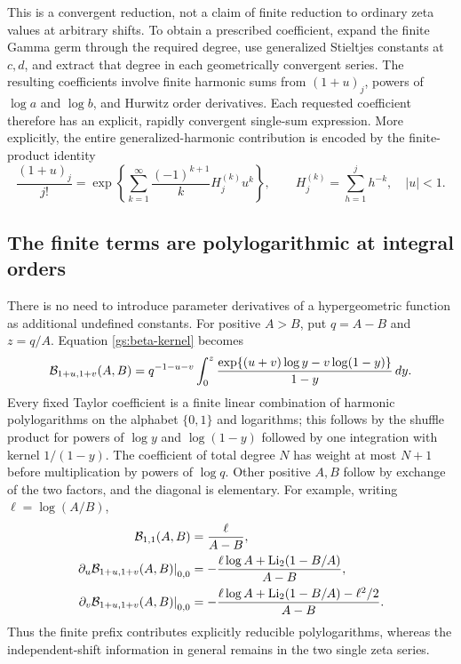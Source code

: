\documentclass[11pt,letterpaper]{article}
\numberwithin{equation}{section}
\theoremstyle{definition}
\theoremstyle{remark}
\begin{document}
This is a convergent reduction, not a claim of finite reduction to
ordinary zeta values at arbitrary shifts.  To obtain a prescribed
coefficient, expand the finite Gamma germ through the required degree,
use generalized Stieltjes constants at $c,d$, and extract that degree
in each geometrically convergent series.  The resulting coefficients
involve finite harmonic sums from $(1+u)_j$, powers of $\log a$ and
$\log b$, and Hurwitz order derivatives.  Each requested coefficient
therefore has an explicit, rapidly convergent single-sum expression.
More explicitly, the entire generalized-harmonic contribution is
encoded by the finite-product identity
\[
 \frac{(1+u)_j}{j!}
 =\exp\left\{\sum_{k=1}^\infty
        \frac{(-1)^{k+1}}{k}H_j^{(k)}u^k\right\},
 \qquad H_j^{(k)}=\sum_{h=1}^j h^{-k},\quad |u|<1.
\]

\subsection{The finite terms are polylogarithmic at integral orders}

There is no need to introduce parameter derivatives of a hypergeometric
function as additional undefined constants.  For positive $A>B$, put
$q=A-B$ and $z=q/A$.  Equation \eqref{gs:beta-kernel} becomes
\begin{equation}\label{gs:polylog-kernel}
 \mathcal B_{1+u,1+v}(A,B)
 =q^{-1-u-v}\int_0^z
       \frac{\exp\{(u+v)\log y-v\log(1-y)\}}{1-y}\,dy.
\end{equation}
Every fixed Taylor coefficient is a finite linear combination of
harmonic polylogarithms on the alphabet $\{0,1\}$ and logarithms;
this follows by the shuffle product for powers of $\log y$ and
$\log(1-y)$ followed by one integration with kernel $1/(1-y)$.
The coefficient of total degree $N$ has weight at most $N+1$ before
multiplication by powers of $\log q$.  Other positive $A,B$ follow
by exchange of the two factors, and the diagonal is elementary.
For example, writing $\ell=\log(A/B)$,
\begin{align}
 \mathcal B_{1,1}(A,B)&=\frac{\ell}{A-B},\notag\\
 \left.\partial_u\mathcal B_{1+u,1+v}(A,B)\right|_{0,0}
 &=-\frac{\ell\log A+\operatorname{Li}_2(1-B/A)}{A-B},\notag\\
 \left.\partial_v\mathcal B_{1+u,1+v}(A,B)\right|_{0,0}
 &=-\frac{\ell\log A+\operatorname{Li}_2(1-B/A)-\ell^2/2}{A-B}.
 \label{gs:dilog-prefix}
\end{align}
Thus the finite prefix contributes explicitly reducible polylogarithms,
whereas the independent-shift information in general remains in the
two single zeta series.
\end{document}
